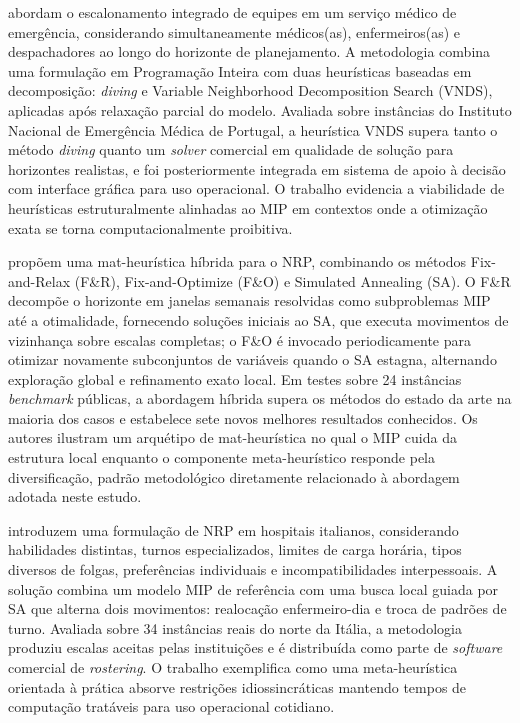  abordam o escalonamento integrado de equipes em um serviço médico de emergência, considerando simultaneamente médicos(as), enfermeiros(as) e despachadores ao longo do horizonte de planejamento. A metodologia combina uma formulação em Programação Inteira com duas heurísticas baseadas em decomposição: \textit{diving} e Variable Neighborhood Decomposition Search (VNDS), aplicadas após relaxação parcial do modelo. Avaliada sobre instâncias do Instituto Nacional de Emergência Médica de Portugal, a heurística VNDS supera tanto o método \textit{diving} quanto um \textit{solver} comercial em qualidade de solução para horizontes realistas, e foi posteriormente integrada em sistema de apoio à decisão com interface gráfica para uso operacional. O trabalho evidencia a viabilidade de heurísticas estruturalmente alinhadas ao MIP em contextos onde a otimização exata se torna computacionalmente proibitiva.

 propõem uma mat-heurística híbrida para o NRP, combinando os métodos Fix-and-Relax (F\&R), Fix-and-Optimize (F\&O) e Simulated Annealing (SA). O F\&R decompõe o horizonte em janelas semanais resolvidas como subproblemas MIP até a otimalidade, fornecendo soluções iniciais ao SA, que executa movimentos de vizinhança sobre escalas completas; o F\&O é invocado periodicamente para otimizar novamente subconjuntos de variáveis quando o SA estagna, alternando exploração global e refinamento exato local. Em testes sobre 24 instâncias \textit{benchmark} públicas, a abordagem híbrida supera os métodos do estado da arte na maioria dos casos e estabelece sete novos melhores resultados conhecidos. Os autores ilustram um arquétipo de mat-heurística no qual o MIP cuida da estrutura local enquanto o componente meta-heurístico responde pela diversificação, padrão metodológico diretamente relacionado à abordagem adotada neste estudo.

 introduzem uma formulação de NRP em hospitais italianos, considerando habilidades distintas, turnos especializados, limites de carga horária, tipos diversos de folgas, preferências individuais e incompatibilidades interpessoais. A solução combina um modelo MIP de referência com uma busca local guiada por SA que alterna dois movimentos: realocação enfermeiro-dia e troca de padrões de turno. Avaliada sobre 34 instâncias reais do norte da Itália, a metodologia produziu escalas aceitas pelas instituições e é distribuída como parte de \textit{software} comercial de \textit{rostering}. O trabalho exemplifica como uma meta-heurística orientada à prática absorve restrições idiossincráticas mantendo tempos de computação tratáveis para uso operacional cotidiano.

